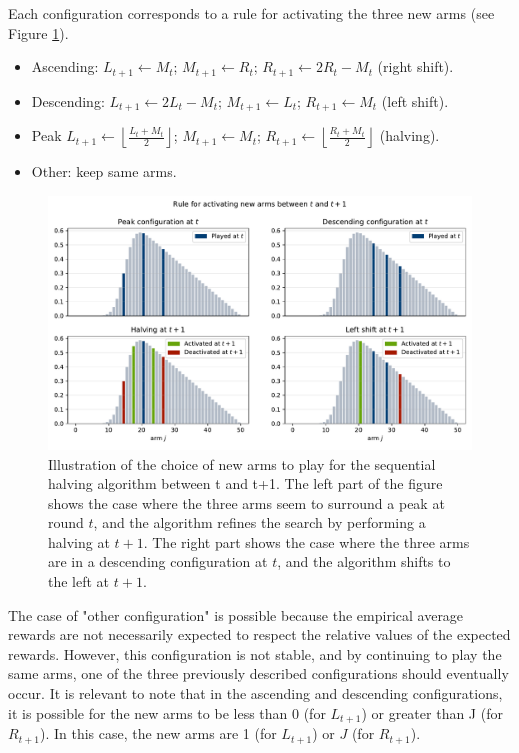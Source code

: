 \documentclass{statsmsc}
\begin{document}
Each configuration corresponds to a rule for activating the three new arms (see Figure \ref{fig:seq-halving}).
\begin{itemize}
\item Ascending: $L_{t+1} \leftarrow M_t$; $M_{t+1} \leftarrow R_t$; $R_{t+1} \leftarrow 2R_t - M_t$ (right shift).
\item Descending: $L_{t+1} \leftarrow 2L_t - M_t$; $M_{t+1} \leftarrow L_t$; $R_{t+1} \leftarrow M_t$ (left shift).
\item Peak $L_{t+1} \leftarrow \left\lfloor \frac{L_t + M_t}{2} \right\rfloor$; $M_{t+1} \leftarrow M_t$; $R_{t+1} \leftarrow \left\lfloor \frac{R_t + M_t}{2} \right\rfloor$ (halving).
\item Other: keep same arms.
\end{itemize}

\begin{figure}[htbp]
  \centering
  \includegraphics[width=\textwidth]{images/sequential_halving.pdf}
  \caption{Illustration of the choice of new arms to play for the sequential halving algorithm between t and t+1. The left part of the figure shows the case where the three arms seem to surround a peak at round $t$, and the algorithm refines the search by performing a halving at $t+1$. The right part shows the case where the three arms are in a descending configuration at $t$, and the algorithm shifts to the left at $t+1$.}
  \label{fig:seq-halving}
\end{figure}

The case of "other configuration" is possible because the empirical average rewards are not necessarily expected to respect the relative values of the expected rewards. However, this configuration is not stable, and by continuing to play the same arms, one of the three previously described configurations should eventually occur.
It is relevant to note that in the ascending and descending configurations, it is possible for the new arms to be less than $0$ (for $L_{t+1}$) or greater than J (for $R_{t+1}$). In this case, the new arms are 1 (for $L_{t+1}$) or $J$ (for $R_{t+1}$).
\end{document}
